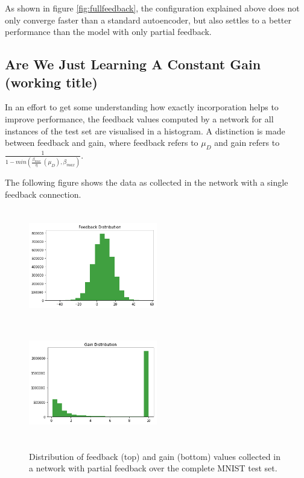 \documentclass{article}
\begin{document}
  As shown in figure \ref{fig:fullfeedback}, the configuration explained above does not only converge faster than a standard autoencoder, but also settles to a better performance than the model with only partial feedback. 
    
 \subsection{Are We Just Learning A Constant Gain (working title)} 
 In an effort to get some understanding how exactly incorporation helps to improve performance, the feedback values computed by a network for all instances of the test set are visualised in a histogram. A distinction is made between feedback and gain, where feedback refers to $\mu_D$ and gain refers to $\frac{1}{1 - min(\frac{\beta_{max}}{\eta} \ (\mu_D), \beta_{max})}$. 
 
 The following figure shows the data as collected in the network with a single feedback connection. 
 
 \begin{figure}
      \centering
      \includegraphics[width=0.5\textwidth,height=5cm,keepaspectratio]{img/constgainpartial.png}
      \includegraphics[width=0.5\textwidth,height=5cm,keepaspectratio]{img/constgainpartialgain.png}

      \caption{Distribution of feedback (top) and gain (bottom) values collected in a network with partial feedback over the complete MNIST test set. }
      \label{fig:partialhists}
  \end{figure}
  
\end{document}
